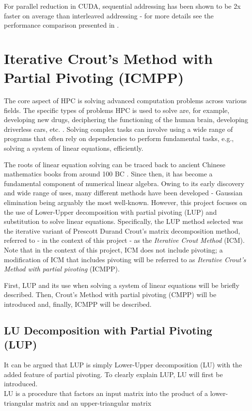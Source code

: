 For parallel reduction in CUDA, sequential addressing has been shown to be 2x faster on average than interleaved addressing \cite{Harris2023} - for more details see the performance comparison presented in  \cite{Harris2023}.



\section{Iterative Crout's Method with Partial Pivoting (ICMPP)}\label{Section:theory->ICMPP}
The core aspect of HPC is solving advanced computation problems across various fields.
The specific types of problems HPC is used to solve are, for example, developing new drugs, deciphering the functioning of the human brain, developing driverless cars, etc. \cite{HY9P0YzuUCw5E5cs}.
Solving complex tasks can involve using a wide range of programs that often rely on dependencies to perform fundamental tasks, e.g., solving a system of linear equations, efficiently.

The roots of linear equation solving can be traced back to ancient Chinese mathematics books from around 100 BC \cite{Hart2011}.
Since then, it has become a fundamental component of numerical linear algebra.
Owing to its early discovery and wide range of uses, many different methods have been developed - Gaussian elimination being arguably the most well-known.
However, this project focuses on the use of Lower-Upper decomposition with partial pivoting (LUP) and substitution to solve linear equations.
Specifically, the LUP method selected was the iterative variant of Prescott Durand Crout's matrix decomposition method, referred to - in the context of this project - as the \textit{Iterative Crout Method} (ICM).
Note that in the context of this project, ICM does not include pivoting; a modification of ICM that includes pivoting will be referred to as \textit{Iterative Crout's Method with partial pivoting} (ICMPP).

First, LUP and its use when solving a system of linear equations will be briefly described.
Then, Crout's Method with partial pivoting (CMPP) will be introduced and, finally, ICMPP will be described.

\subsection{LU Decomposition with Partial Pivoting (LUP)}\label{Subsection:theory->ICMPP->LUP}
It can be argued that LUP is simply Lower-Upper decomposition (LU) with the added feature of partial pivoting.
To clearly explain LUP, LU will first be introduced.\\
LU is a procedure that factors an input matrix into the product of a lower-triangular matrix and an upper-triangular matrix


